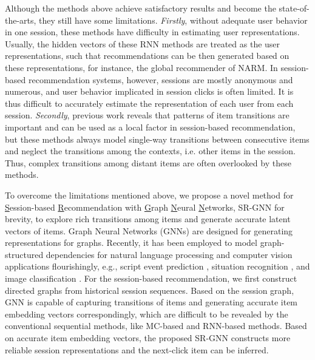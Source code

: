 \documentclass[letterpaper]{article} \usepackage{cite}
\begin{document}
Although the methods above achieve satisfactory results and become the state-of-the-arts, they still have some limitations. {\it Firstly}, without adequate user behavior in one session, these methods have difficulty in estimating user representations. Usually, the hidden vectors of these RNN methods are treated as the user representations, such that recommendations can be then generated based on these representations, for instance, the global recommender of NARM. In session-based recommendation systems, however, sessions are mostly anonymous and numerous, and user behavior implicated in session clicks is often limited. It is thus difficult to accurately estimate the representation of each user from each session. {\it Secondly}, previous work reveals that patterns of item transitions are important and can be used as a local factor \cite{Li:2017:NAS:3132847.3132926,Liu:2018:SSA:3219819.3219950} in session-based recommendation, but these methods always model single-way transitions between consecutive items and neglect the transitions among the contexts, i.e. other items in the session. Thus, complex transitions among distant items are often overlooked by these methods.

To overcome the limitations mentioned above, we propose a novel method for {\underline S}ession-based {\underline R}ecommendation with {\underline G}raph {\underline N}eural {\underline N}etworks, SR-GNN for brevity, to explore rich transitions among items and generate accurate latent vectors of items. Graph Neural Networks (GNNs) \cite{4700287,DBLP:journals/corr/LiTBZ15} are designed for generating representations for graphs. Recently, it has been employed to model graph-structured dependencies for natural language processing and computer vision applications flourishingly, e.g., script event prediction \cite{EEG2018}, situation recognition \cite{8237710}, and image classification \cite{8099493}. For the session-based recommendation, we first construct directed graphs from historical session sequences. Based on the session graph, GNN is capable of capturing transitions of items and generating accurate item embedding vectors correspondingly, which are difficult to be revealed by the conventional sequential methods, like MC-based and RNN-based methods. Based on accurate item embedding vectors, the proposed SR-GNN constructs more reliable session representations and the next-click item can be inferred.
\end{document}

